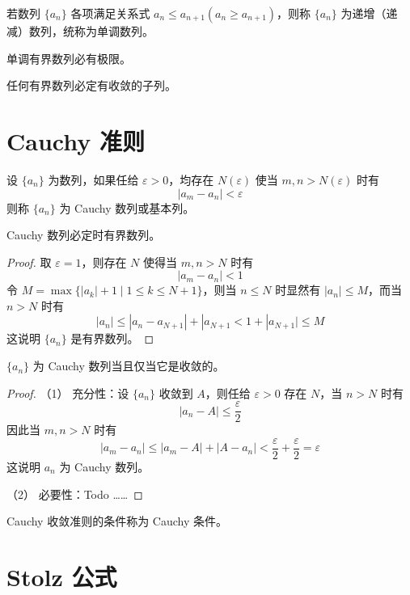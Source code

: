 \begin{definition}
	若数列 $\{a_n\}$ 各项满足关系式 $a_n \leqslant a_{n+1}(a_n \geqslant a_{n+1})$，则称 $\{a_n\}$ 为递增（递减）数列，统称为单调数列。
\end{definition}

\begin{theorem}[单调有界定理]
	单调有界数列必有极限。
\end{theorem}

\begin{theorem}[致密性定理]
	任何有界数列必定有收敛的子列。
\end{theorem}

\section{Cauchy 准则}

\begin{definition}
	设 $\{a_n\}$ 为数列，如果任给 $\varepsilon>0$，均存在 $N(\varepsilon)$ 使当 $m,n>N(\varepsilon)$ 时有
	$$|a_m-a_n| < \varepsilon$$
	则称 $\{a_n\}$ 为 Cauchy 数列或基本列。
\end{definition}

\begin{theorem}
	Cauchy 数列必定时有界数列。
\end{theorem}
\begin{proof}
	取 $\varepsilon=1$，则存在 $N$ 使得当 $m,n>N$ 时有
	$$|a_m-a_n| < 1$$
	令 $M = \max\{|a_k|+1 \mid 1 \leqslant k \leqslant N+1\}$，则当 $n\leqslant N$ 时显然有 $|a_n|\leqslant M$，而当 $n>N$ 时有
	$$|a_n| \leqslant |a_n-a_{N+1}| + |a_{N+1} < 1+ |a_{N+1}| \leqslant M$$
	这说明 $\{a_n\}$ 是有界数列。
\end{proof}

\begin{theorem}
	$\{a_n\}$ 为 Cauchy 数列当且仅当它是收敛的。
\end{theorem}
\begin{proof}
	（1） 充分性：设 $\{a_n\}$ 收敛到 $A$，则任给 $\varepsilon >0$ 存在 $N$，当 $n>N$ 时有
	$$|a_n-A|\leqslant \frac{\varepsilon}{2}$$
	因此当 $m,n>N$ 时有
	$$|a_m-a_n| \leqslant |a_m-A| + |A-a_n| < \frac{\varepsilon}{2}+\frac{\varepsilon}{2}=\varepsilon$$
	这说明 $a_n$ 为 Cauchy 数列。
	
	（2） 必要性：Todo ……
\end{proof}

Cauchy 收敛准则的条件称为 Cauchy 条件。

\section{Stolz 公式}

